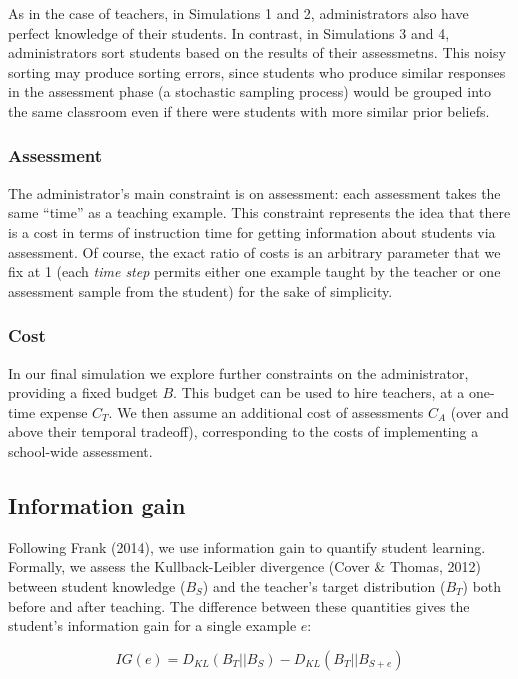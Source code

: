 \documentclass[man]{apa6}
\begin{document}
As in the case of teachers, in Simulations 1 and 2, administrators also
have perfect knowledge of their students. In contrast, in Simulations 3
and 4, administrators sort students based on the results of their
assessmetns. This noisy sorting may produce sorting errors, since
students who produce similar responses in the assessment phase (a
stochastic sampling process) would be grouped into the same classroom
even if there were students with more similar prior beliefs.

\subsubsection{Assessment}\label{assessment}

The administrator's main constraint is on assessment: each assessment
takes the same ``time'' as a teaching example. This constraint
represents the idea that there is a cost in terms of instruction time
for getting information about students via assessment. Of course, the
exact ratio of costs is an arbitrary parameter that we fix at 1 (each
\emph{time step} permits either one example taught by the teacher or one
assessment sample from the student) for the sake of simplicity.

\subsubsection{Cost}\label{cost}

In our final simulation we explore further constraints on the
administrator, providing a fixed budget \(B\). This budget can be used
to hire teachers, at a one-time expense \(C_T\). We then assume an
additional cost of assessments \(C_A\) (over and above their temporal
tradeoff), corresponding to the costs of implementing a school-wide
assessment.

\subsection{Information gain}\label{information-gain}

Following Frank (2014), we use information gain to quantify student
learning. Formally, we assess the Kullback-Leibler divergence (Cover \&
Thomas, 2012) between student knowledge (\(B_S\)) and the teacher's
target distribution (\(B_T\)) both before and after teaching. The
difference between these quantities gives the student's information gain
for a single example \(e\):

\[IG(e) = D_{KL}(B_T ||B_S) - D_{KL}(B_T || B_{S+e})\]
\end{document}
